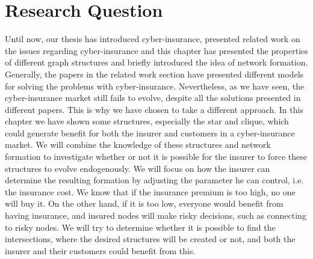 \section{Research Question}
Until now, our thesis has introduced cyber-insurance, presented related work on the issues regarding cyber-insurance and this chapter has presented the properties of different graph structures and briefly introduced the idea of network formation. Generally, the papers in the related work section have presented different models for solving the problems with cyber-insurance. Nevertheless, as we have seen, the cyber-insurance market still fails to evolve, despite all the solutions presented in different papers. This is why we have chosen to take a different approach.
In this chapter we have shown some structures, especially the star and clique, which could generate benefit for both the insurer and customers in a cyber-insurance market. We will combine the knowledge of these structures and network formation to investigate whether or not it is possible for the insurer to force these structures to evolve endogenously. We will focus on how the insurer can determine the resulting formation by adjusting the parameter he can control, i.e. the insurance cost. We know that if the insurance premium is too high, no one will buy it. On the other hand, if it is too low, everyone would benefit from having insurance, and insured nodes will make risky decisions, such as connecting to risky nodes. We will try to determine whether it is possible to find the intersections, where the desired structures will be created or not, and both the insurer and their customers could benefit from this.

